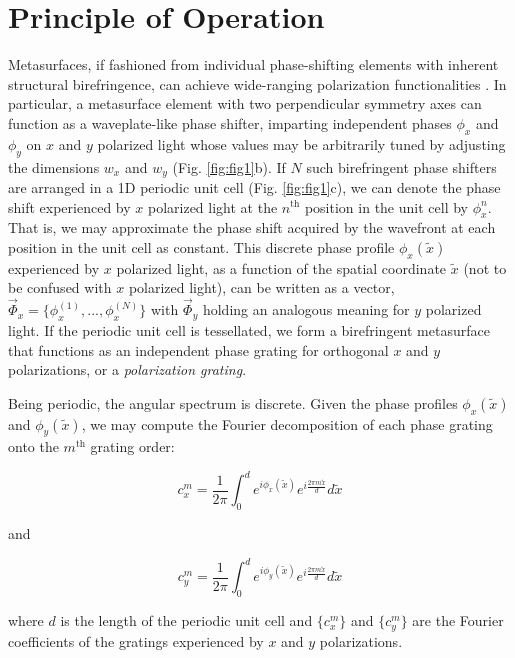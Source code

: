 \documentclass[footinbib,aps,prl,twocolumn,superscriptaddress]{revtex4-1}
\begin{document}
\section{Principle of Operation}

Metasurfaces, if fashioned from individual phase-shifting elements with inherent structural birefringence, can achieve wide-ranging polarization functionalities \cite{Arbabi2015, Mueller2017}. In particular, a metasurface element with two perpendicular symmetry axes \cite{Menzel2010} can function as a waveplate-like phase shifter, imparting independent phases $\phi_x$ and $\phi_y$ on $x$ and $y$ polarized light whose values may be arbitrarily tuned by adjusting the dimensions $w_x$ and $w_y$ (Fig. \ref{fig:fig1}b). If $N$ such birefringent phase shifters are arranged in a 1D  periodic unit cell (Fig. \ref{fig:fig1}c), we can denote the phase shift experienced by $x$ polarized light at the $n^{\text{th}}$ position in the unit cell by $\phi_x^n$. That is, we may approximate the phase shift acquired by the wavefront at each position in the unit cell as constant. This discrete phase profile $\phi_x(\tilde{x})$ experienced by $x$ polarized light, as a function of the spatial coordinate $\tilde{x}$ (not to be confused with $x$ polarized light), can be written as a vector, $\vec{\Phi}_x = \{\phi_x^{(1)}, ..., \phi_x^{(N)}\}$ with $\vec{\Phi}_y$ holding an analogous meaning for $y$ polarized light. If the periodic unit cell is tessellated, we form a birefringent metasurface that functions as an independent phase grating for orthogonal $x$ and $y$ polarizations, or a \textit{polarization grating}.

Being periodic, the angular spectrum is discrete. Given the phase profiles $\phi_x(\tilde{x})$ and $\phi_y(\tilde{x})$, we may compute the Fourier decomposition of each phase grating onto the $m^{\text{th}}$ grating order:

\begin{equation}
	\label{fourier_x}
	c_x^{m} = 
	\frac{1}{2\pi}\int_{0}^{d} e^{i \phi_x(\tilde{x})} e^{i \frac{2\pi m \tilde{x}}{d}} d\tilde{x}
\end{equation}

and

\begin{equation}
	\label{fourier_y}
	c_y^{m} = 
	\frac{1}{2\pi}\int_{0}^{d} e^{i \phi_y(\tilde{x})} e^{i \frac{2\pi m \tilde{x}}{d}} d\tilde{x}
\end{equation}

where $d$ is the length of the periodic unit cell and $\{c_x^m\}$ and $\{c_y^m\}$ are the Fourier coefficients of the gratings experienced by $x$ and $y$ polarizations. 
\end{document}
